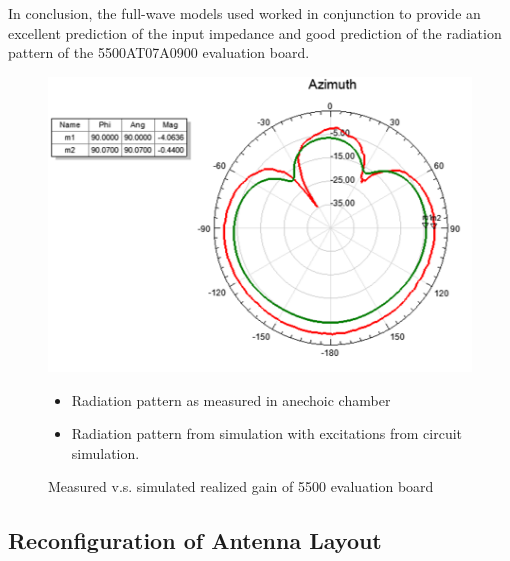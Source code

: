 \documentclass[12pt]{usfcoe}
\begin{document}
    In conclusion, the full-wave models used worked in conjunction to provide an excellent prediction of the input impedance and good prediction of the radiation pattern of the 5500AT07A0900 evaluation board.
    

    \begin{figure}[H]
		\begin{center}
        	\includegraphics[width=\textwidth]{images/5500_simulation/azimuth.png} 
            \vspace{-\topsep}
            \begin{itemize}
                \centering
                \setlength{\parskip}{0pt}
                \setlength{\itemsep}{0pt} 
                \color{red}
                \item Radiation pattern as measured in anechoic chamber
                \color{darkgreen}
                \item Radiation pattern from simulation with excitations from circuit simulation.
            \end{itemize}
            \vspace*{-9pt}
            
			\caption{Measured v.s. simulated realized gain of 5500 evaluation board} 
			\label{fig:5500_azimuth}
		\end{center}
            
	\end{figure}    


    \subsection{Reconfiguration of Antenna Layout}
    
\end{document}
